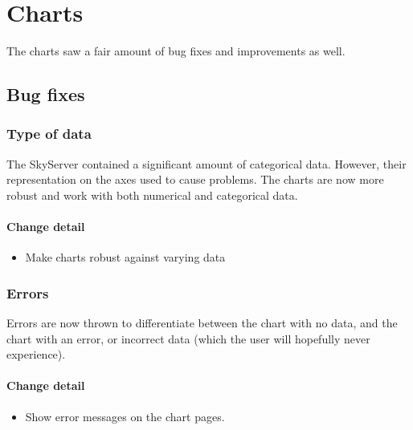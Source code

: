 \section{Charts}
The charts saw a fair amount of bug fixes and improvements as well.


\subsection{Bug fixes}
  \subsubsection{Type of data}
  The SkyServer contained a significant amount of categorical data. However, their representation on the axes
  used to cause problems. The charts are now more robust and work with both numerical and categorical data.
  
 \paragraph{Change detail}
\begin{itemize}
  \item Make charts robust against varying data
\end{itemize}
  
 \subsubsection{Errors}
  Errors are now thrown to differentiate between the chart with no data, and the chart with an error,
  or incorrect data (which the user will hopefully never experience). 
  
   \paragraph{Change detail}
\begin{itemize}
  \item Show error messages on the chart pages.
\end{itemize}
  
